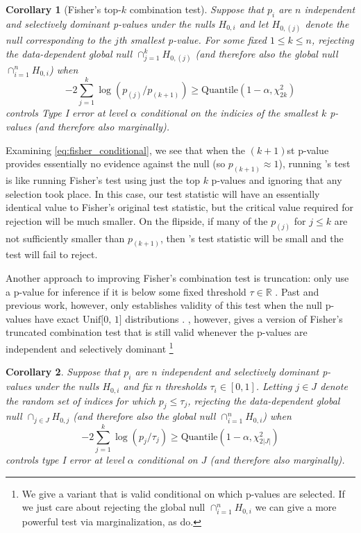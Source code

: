 \documentclass{article}
\newtheorem{corollary}{Corollary}
\newcommand{\R}{\mathbb{R}}
\begin{document}
\begin{corollary}[Fisher's top-$k$ combination test]
    \label{cor:cfisher}
    Suppose that $p_i$ are $n$ independent and selectively dominant p-values under the nulls $H_{0, i}$ and let $H_{0, (j)}$ denote the null corresponding to the $j$th smallest p-value. For some fixed $1 \leq k \leq n$,  rejecting the data-dependent global null $\cap_{j=1}^k H_{0, (j)}$ (and therefore also the global null $\cap_{i=1}^n H_{0, i}$) when 
    \begin{equation}
        \label{eq:fisher_conditional}
        -2 \sum_{j=1}^k \log(p_{(j)}/p_{(k+1)}) \geq \text{Quantile}(1-\alpha, \chi^2_{2k})
    \end{equation}
    controls Type I error at level $\alpha$ conditional on the indicies of the smallest $k$ p-values (and therefore also marginally). 
\end{corollary}

Examining \eqref{eq:fisher_conditional}, we see that when the $(k+1)$st p-value provides essentially no evidence against the null (so $p_{(k+1)} \approx 1$), running 's test is like running Fisher's test using just the top $k$ p-values and ignoring that any selection took place. In this case, our test statistic will have an essentially identical value to Fisher's original test statistic, but the critical value required for rejection will be much smaller. On the flipside, if many of the $p_{(j)}$ for $j \leq k$ are not sufficiently smaller than $p_{(k+1)}$, then 's test statistic will be small and the test will fail to reject.

Another approach to improving Fisher's combination test is truncation: only use a p-value for inference if it is below some fixed threshold $\tau \in \R$ \citep{Zaykin}. Past and previous work, however, only establishes validity of this test when the null p-values have exact $\text{Unif[0, 1]}$ distributions \cite{Zaykin, Zhang}. , however, gives a version of Fisher's truncated combination test that is still valid whenever the p-values are independent and selectively dominant \footnote{We give a variant that is valid conditional on which p-values are selected. If we just care about rejecting the global null $\cap_{i=1}^n H_{0, i}$ we can give a more powerful test via marginalization, as \cite{Zaykin} do.}

\begin{corollary}
    \label{cor:tfisher}
    Suppose that $p_i$ are $n$ independent and selectively dominant p-values under the nulls $H_{0, i}$ and fix $n$ thresholds $\tau_i \in [0, 1]$. Letting $j \in J$ denote the random set of indices for which $p_j \leq \tau_j$, rejecting the data-dependent global null $\cap_{j \in J} H_{0, j}$ (and therefore also the global null $\cap_{i=1}^n H_{0, i}$) when 
    \begin{equation*}
        -2 \sum_{j=1}^k \log(p_j/\tau_j) \geq \text{Quantile}(1-\alpha, \chi^2_{2|J|})
    \end{equation*} 
    controls type I error at level $\alpha$ conditional on $J$ (and therefore also marginally). 
\end{corollary}
\end{document}
